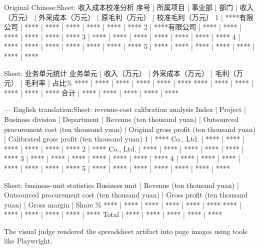 \documentclass{llmxive}
\begin{document}
\begin{casebox}\scriptsize
\begin{caselines}
Original Chinese:\nopagebreak[4]
Sheet: 收入成本校准分析
序号 | 所属项目 | 事业部 | 部门 | 收入（万元） | 外采成本（万元） | 原毛利（万元） | 校准毛利（万元）
1 | ****有限公司 | **** | **** | **** | **** | **** | ****
2 | ****有限公司 | **** | **** | **** | **** | **** | ****
3 | **** | **** | **** | **** | **** | **** | ****
4 | **** | **** | **** | **** | **** | **** | ****
5 | **** | **** | **** | **** | **** | **** | ****

Sheet: 业务单元统计
业务单元 | 收入（万元） | 外采成本（万元） | 毛利（万元） | 毛利率 | 占比\%
**** | **** | **** | **** | **** | ****
**** | **** | **** | **** | **** | ****
合计 | **** | **** | **** | **** | ****

---
English translation:\nopagebreak[4]
Sheet: revenue-cost calibration analysis
Index | Project | Business division | Department | Revenue (ten thousand yuan) | Outsourced procurement cost (ten thousand yuan) | Original gross profit (ten thousand yuan) | Calibrated gross profit (ten thousand yuan)
1 | **** Co., Ltd. | **** | **** | **** | **** | **** | ****
2 | **** Co., Ltd. | **** | **** | **** | **** | **** | ****
3 | **** | **** | **** | **** | **** | **** | ****
4 | **** | **** | **** | **** | **** | **** | ****
5 | **** | **** | **** | **** | **** | **** | ****

Sheet: business-unit statistics
Business unit | Revenue (ten thousand yuan) | Outsourced procurement cost (ten thousand yuan) | Gross profit (ten thousand yuan) | Gross margin | Share \%
**** | **** | **** | **** | **** | ****
**** | **** | **** | **** | **** | ****
Total | **** | **** | **** | **** | ****
\end{caselines}
\end{casebox}
The visual judge rendered the spreadsheet artifact into page images using tools like Playwright. 
\end{document}
